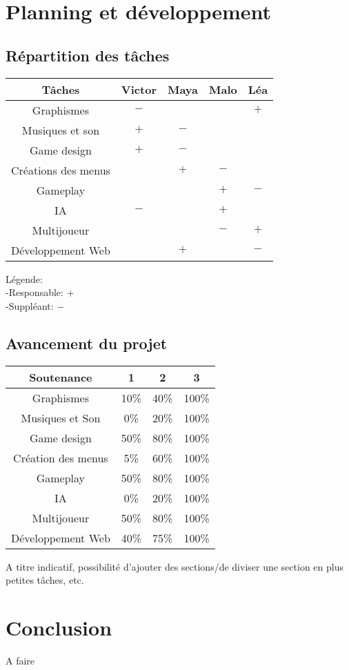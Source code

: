\documentclass{article}
\begin{document}
\section{Planning et développement}
\subsection{Répartition des tâches}
\begin{center}
	\begin{tabular}{|c||c|c|c|c|}
	\hline
    \textbf{Tâches} & \textbf{Victor} & \textbf{Maya} & \textbf{Malo} & \textbf{Léa} \\ \hline
    Graphismes & $-$& & & $+$\\ \hline
    Musiques et son & $+$& $-$& & \\ \hline
    Game design & $+$ & $-$ &  & \\ \hline
    Créations des menus & & $+$& $-$& \\ \hline
    Gameplay & & & $+$ & $-$\\ \hline
    IA & $-$ & & $+$&\\ \hline
    Multijoueur & &  & $-$&$+$\\ 
    \hline
    Développement Web &  & $+$ & & $-$\\ \hline
	\end{tabular}
\end{center}
Légende:\\
\hspace*{1cm}-Responsable: $+$ \\
\hspace*{1cm}-Suppléant: $-$

\subsection{Avancement du projet}
\begin{center}
   \begin{tabular}{ | c || c | c | c | }
     \hline
 	 \textbf{Soutenance} & \textbf{1} & \textbf{2} & \textbf{3}    \\ \hline
     Graphismes & 10\% & 40\% & 100\% \\ \hline
     Musiques et Son & 0\% & 20\% & 100\% \\ \hline
     Game design & 50\% & 80\% & 100\% \\ \hline
     Création des menus & 5\% & 60\%  & 100\% \\ \hline
     Gameplay & 50\% & 80\%  & 100\% \\ \hline
     IA & 0\% & 20\%  & 100\% \\ \hline
     Multijoueur & 50\% & 80\% & 100\% \\ \hline
     Développement Web & 40\% & 75\% & 100\% \\ \hline
   \end{tabular}
 \end{center}

A titre indicatif, possibilité d'ajouter des sections/de diviser une section en plus petites tâches, etc.

\section{Conclusion}
A faire
\end{document}
